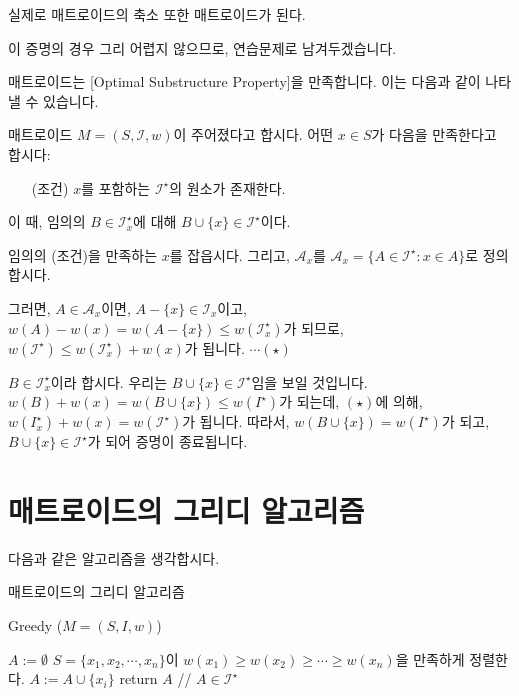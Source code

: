 \documentclass[11pt, a4paper]{book}
\newcommand{\I}{\mathcal{I}}
\newcommand{\A}{\mathcal{A}}
\begin{document}
    \begin{MLPrp}
        실제로 매트로이드의 축소 또한 매트로이드가 된다.
    \end{MLPrp}
    
    이 증명의 경우 그리 어렵지 않으므로, 연습문제로 남겨두겠습니다.
    
    매트로이드는 [Optimal Substructure Property]을 만족합니다. 이는 다음과 같이 나타낼 수 있습니다.
    
    \begin{MLLem}
        매트로이드 $M = (S, \I, w)$이 주어졌다고 합시다. 어떤 $x \in S$가 다음을 만족한다고 합시다:
        \begin{itemize}
            \item[(조건)] $x$를 포함하는 $\I^\star$의 원소가 존재한다.
        \end{itemize}
        이 때, 임의의 $B \in \I_x^\star$에 대해 $B \cup \{x\} \in \I^\star$이다.
    \end{MLLem}
    
    \begin{MLPrf}
        임의의 (조건)을 만족하는 $x$를 잡읍시다. 그리고, $\A_x$를 $\A_x = \{ A \in \I^\star : x \in A \}$로 정의합시다.
        
        그러면, $A \in \A_x$이면, $A - \{x\} \in \I_x$이고, $w(A) - w(x) = w(A - \{x\}) \le w(\I_x^\star)$가 되므로, $w(\I^\star) \le w(\I_x^\star) + w(x)$가 됩니다. $\cdots(\star)$
        
        $B \in \I_x^\star$이라 합시다. 우리는 $B \cup \{x\} \in \I^\star$임을 보일 것입니다. $w(B) + w(x) = w(B\cup\{x\}) \le w(I^\star)$가 되는데, $(\star)$에 의해, $w(I_x^\star) + w(x) = w(\I^\star)$가 됩니다. 따라서, $w(B \cup \{x\}) = w(I^\star)$가 되고, $B \cup \{x\} \in \I^\star$가 되어 증명이 종료됩니다.
    \end{MLPrf}
    
    \section{매트로이드의 그리디 알고리즘}
    
    다음과 같은 알고리즘을 생각합시다.
    
    \begin{algorithm}
        \caption{매트로이드의 그리디 알고리즘}
        Greedy ($M = (S, I, w)$)
        \begin{algorithmic}
            \STATE $A := \emptyset$
            \STATE $S = \{x_1, x_2, \cdots, x_n\}$이 $w(x_1) \ge w(x_2) \ge \cdots \ge w(x_n)$을 만족하게 정렬한다.
                \IF{$A \cup \{x_i\} \in \I$}
                    \STATE $A := A \cup \{x_i\}$
                \ENDIF
            \ENDFOR
            \STATE return $A$ // $A \in \I^\star$
        \end{algorithmic}
    \end{algorithm}
    
\end{document}
